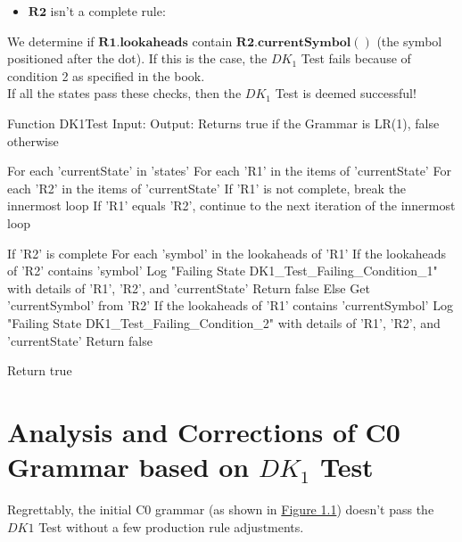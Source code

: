 \begin{itemize}
    \item \(\boldsymbol{R2}\) isn't a complete rule:
\end{itemize}

We determine if \(\boldsymbol{R1.lookaheads}\) contain \(\boldsymbol{R2.currentSymbol()}\) (the symbol positioned after the dot). If this is the case, the \(DK_{1}\) Test fails because of condition 2 as specified in the book.\\

If all the states pass these checks, then the \(DK_{1}\) Test is deemed successful!\\

\begin{codeblock}
    Function DK1Test
    Input:
    Output: Returns true if the Grammar is LR(1), false otherwise

    For each 'currentState' in 'states'
    For each 'R1' in the items of 'currentState'
    For each 'R2' in the items of 'currentState'
    If 'R1' is not complete, break the innermost loop
    If 'R1' equals 'R2', continue to the next iteration of the innermost loop

    If 'R2' is complete
    For each 'symbol' in the lookaheads of 'R1'
    If the lookaheads of 'R2' contains 'symbol'
    Log "Failing State DK1_Test_Failing_Condition_1" with details of 'R1', 'R2', and 'currentState'
    Return false
    Else
    Get 'currentSymbol' from 'R2'
    If the lookaheads of 'R1' contains 'currentSymbol'
    Log "Failing State DK1_Test_Failing_Condition_2" with details of 'R1', 'R2', and 'currentState'
    Return false

    Return true
\end{codeblock}

\newpage


\section{Analysis and Corrections of C0 Grammar based on \(DK_{1}\) Test}\label{sec:Analysis and Corrections of C0 Grammar based on DK1 Test}

Regrettably, the initial C0 grammar (as shown in \hyperref[fig:grammar_c0]{Figure 1.1}) doesn’t pass the \(DK1\) Test without a few production rule adjustments.\\


